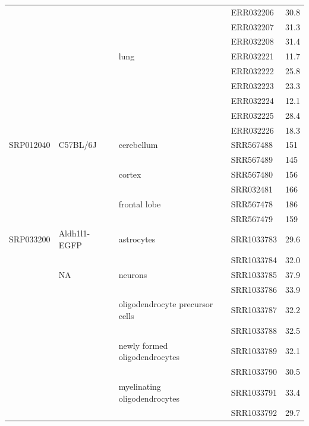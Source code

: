 \begin{longtabu} {X[0.9,c]X[1.1,l]X[1.2,l]X[1,l]X[1,c]}
            &           &              & ERR032206 & 30.8\\
            &           &              & ERR032207 & 31.3\\
            &           &              & ERR032208 & 31.4\\
            &           & lung         & ERR032221 & 11.7\\
            &           &              & ERR032222 & 25.8\\
            &           &              & ERR032223 & 23.3\\
            &           &              & ERR032224 & 12.1\\
            &           &              & ERR032225 & 28.4\\
            &           &              & ERR032226 & 18.3\\
  \midrule
  SRP012040 & C57BL/6J  & cerebellum   & SRR567488 & 151 \\
            &           &              & SRR567489 & 145 \\
            &           & cortex       & SRR567480 & 156 \\
            &           &              & SRR032481 & 166 \\
            &           & frontal lobe & SRR567478 & 186 \\
            &           &              & SRR567479 & 159 \\
  \midrule
  SRP033200 & Aldh1l1-EGFP & astrocytes  & SRR1033783 & 29.6\\
            &              &             & SRR1033784 & 32.0\\
            & NA           & neurons     & SRR1033785 & 37.9\\
            &              &             & SRR1033786 & 33.9\\
            &              & oligodendrocyte precursor cells & SRR1033787 & 32.2\\
            &              &             & SRR1033788 & 32.5\\
            &              & newly formed oligodendrocytes & SRR1033789 & 32.1\\
            &              &             & SRR1033790 & 30.5\\
            &              & myelinating oligodendrocytes & SRR1033791 & 33.4\\
            &              &             & SRR1033792 & 29.7\\

\end{longtabu}

